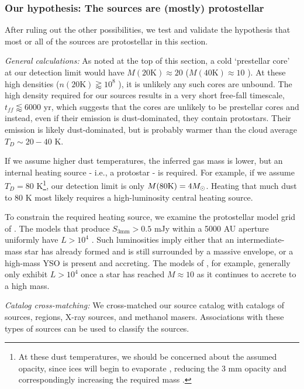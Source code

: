 \documentclass[twocolumn]{aastex61}
\begin{document}
\subsubsection{Our hypothesis: The sources are (mostly) protostellar}
\label{sec:theyareprotostars}
After ruling out the other possibilities, we test and validate the hypothesis
that most or all of the sources are protostellar in this section.


\emph{General calculations:}
As noted at the top of this section, a cold `prestellar core' at our detection
limit would have $M(20\mathrm{K})\approx20$ \msun ($M(40\mathrm{K})\approx10$
\msun).  At these high densities ($n(20 \mathrm{K})\gtrapprox10^8$ \percc), it
is unlikely any
such cores are unbound.  The high density required for our sources results in a very short
free-fall timescale, $t_{ff}\lessapprox6000$ yr, which suggests that the cores
are unlikely to be prestellar cores and instead, even if their emission is
dust-dominated, they contain protostars.  Their emission is likely
dust-dominated, but is probably warmer than the cloud average $T_D\sim20-40$ K.  

If we assume higher dust temperatures, the inferred gas mass is lower, but an
internal heating source - i.e., a protostar - is required.  For example,
if we assume $T_D=80$ K\footnote{At these dust temperatures,
we should be concerned about the assumed opacity, since ices
will begin to evaporate  \citep[e.g.,][]{Bergin1995a}, reducing the 3 mm
opacity and correspondingly increasing the required mass
\citep{Ossenkopf1994a}.  }, our detection limit is only $M(80\mathrm{K}) = 4
M_{\odot}$.  Heating that much dust to 80 K most likely requires a high-luminosity
central heating source.

To constrain the required heating source, we examine the protostellar model grid
of \citet{Robitaille2017a}.  The models that produce $S_{3 \mathrm{mm}} > 0.5$
mJy within a 5000 AU aperture uniformly have $L>10^4$ \lsun.  Such luminosities
imply either that an intermediate-mass star has already formed and is still
surrounded by a massive envelope, or a high-mass YSO is present and accreting.
The models of \citet{Zhang2015f}, for example, generally only exhibit $L>10^4$
\lsun once a star has reached $M\approx10$ \msun as it continues to accrete to
a high mass.



\emph{Catalog cross-matching:}
We cross-matched our source catalog with catalogs of \ammonia sources, \hii
regions, X-ray sources, and methanol masers.  Associations with these types of
sources can be used to classify the sources.
\end{document}
